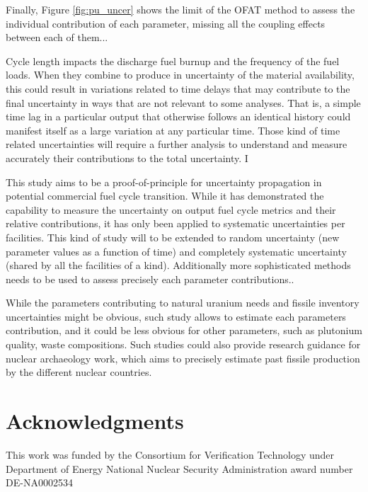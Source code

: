 \documentclass{anstrans}
\begin{document}
Finally, Figure \ref{fig:pu_uncer} shows the limit of the \gls{OFAT} method to
assess the individual contribution of each parameter, missing all the coupling
effects between each of them... 

Cycle length impacts the discharge fuel burnup and the frequency of the fuel
loads.  When they combine to produce in uncertainty of the material
availability, this could result in variations related to time delays that may
contribute to the final uncertainty in ways that are not relevant to some
analyses.  That is, a simple time lag in a particular output that otherwise
follows an identical history could manifest itself as a large variation at any
particular time.  Those kind of time related uncertainties will require a
further analysis to understand and measure accurately their contributions to the
total uncertainty. I 

This study aims to be a proof-of-principle for uncertainty propagation in
potential commercial fuel cycle transition.  While it has demonstrated the
capability to measure the uncertainty on output fuel cycle metrics and their
relative contributions, it has only been applied to systematic uncertainties per
facilities.  This kind of study will to be extended to random uncertainty (new
parameter values as a function of time) and completely systematic uncertainty
(shared by all the facilities of a kind). Additionally more sophisticated
methods needs to be used to assess precisely each parameter contributions..

While the parameters contributing to natural uranium needs and fissile inventory
uncertainties might be obvious, such study allows to estimate each parameters
contribution, and it could be less obvious for other parameters, such as
plutonium quality, waste compositions.  Such studies could also provide research
guidance for nuclear archaeology work, which aims to precisely estimate past
fissile production by the different nuclear countries.




\section{Acknowledgments}
This work was funded by the Consortium for Verification Technology under
Department of Energy National Nuclear Security Administration award number
DE-NA0002534



\end{document}
